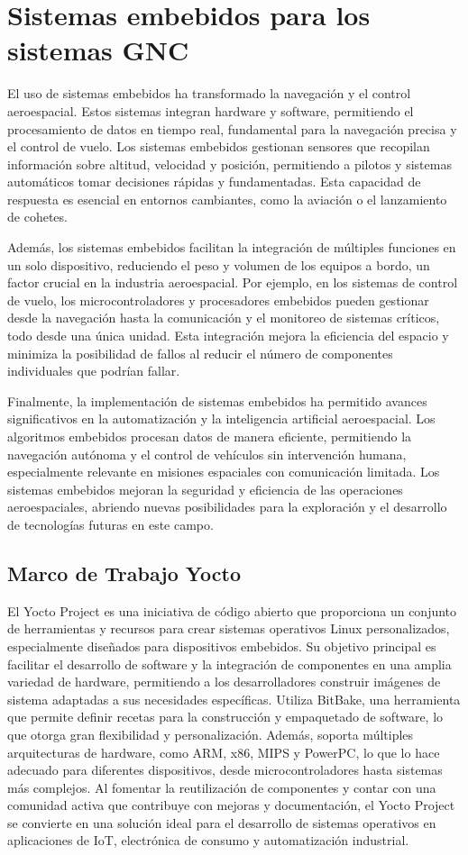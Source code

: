 \section{Sistemas embebidos para los sistemas GNC}
El uso de sistemas embebidos ha transformado la navegación y el control aeroespacial. Estos sistemas 
integran hardware y software, permitiendo el procesamiento de datos en tiempo real, fundamental para 
la navegación precisa y el control de vuelo. Los sistemas embebidos gestionan sensores que recopilan 
información sobre altitud, velocidad y posición, permitiendo a pilotos y sistemas automáticos tomar 
decisiones rápidas y fundamentadas. Esta capacidad de respuesta es esencial en entornos cambiantes, 
como la aviación o el lanzamiento de cohetes.

Además, los sistemas embebidos facilitan la integración de múltiples funciones en un solo dispositivo,
 reduciendo el peso y volumen de los equipos a bordo, un factor crucial en la industria aeroespacial. 
 Por ejemplo, en los sistemas de control de vuelo, los microcontroladores y procesadores embebidos pueden
  gestionar desde la navegación hasta la comunicación y el monitoreo de sistemas críticos, todo desde una 
  única unidad. Esta integración mejora la eficiencia del espacio y minimiza la posibilidad de fallos al 
  reducir el número de componentes individuales que podrían fallar.

Finalmente, la implementación de sistemas embebidos ha permitido avances significativos en la automatización 
y la inteligencia artificial aeroespacial. Los algoritmos embebidos procesan datos de manera eficiente, permitiendo 
la navegación autónoma y el control de vehículos sin intervención humana, especialmente relevante en misiones
 espaciales con comunicación limitada. Los sistemas embebidos mejoran la seguridad y eficiencia de las operaciones 
 aeroespaciales, abriendo nuevas posibilidades para la exploración y el desarrollo de tecnologías futuras en este campo.

\subsection{Marco de Trabajo Yocto}
El Yocto Project es una iniciativa de código abierto que proporciona un conjunto de herramientas y recursos para crear 
sistemas operativos Linux personalizados, especialmente diseñados para dispositivos embebidos. Su objetivo principal es 
facilitar el desarrollo de software y la integración de componentes en una amplia variedad de hardware, permitiendo a los 
desarrolladores construir imágenes de sistema adaptadas a sus necesidades específicas. Utiliza BitBake, una herramienta que 
permite definir recetas para la construcción y empaquetado de software, lo que otorga gran flexibilidad y personalización. 
Además, soporta múltiples arquitecturas de hardware, como ARM, x86, MIPS y PowerPC, lo que lo hace adecuado para diferentes 
dispositivos, desde microcontroladores hasta sistemas más complejos. Al fomentar la reutilización de componentes y contar con 
una comunidad activa que contribuye con mejoras y documentación, el Yocto Project se convierte en una solución ideal para el 
desarrollo de sistemas operativos en aplicaciones de IoT, electrónica de consumo y automatización industrial.


